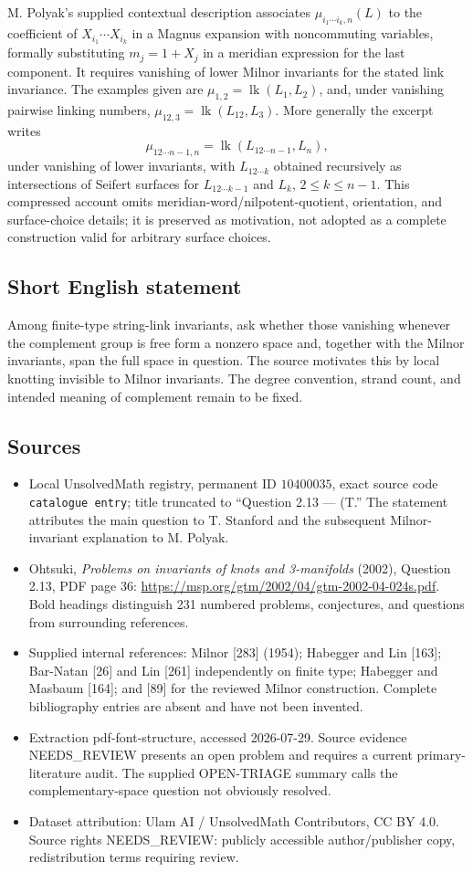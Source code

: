\documentclass[11pt]{article}
\begin{document}
M. Polyak's supplied contextual description associates \(\mu_{i_1\cdots i_k,n}(L)\) to the coefficient of \(X_{i_1}\cdots X_{i_k}\) in a Magnus expansion with noncommuting variables, formally substituting \(m_j=1+X_j\) in a meridian expression for the last component. It requires vanishing of lower Milnor invariants for the stated link invariance. The examples given are \(\mu_{1,2}=\operatorname{lk}(L_1,L_2)\), and, under vanishing pairwise linking numbers, \(\mu_{12,3}=\operatorname{lk}(L_{12},L_3)\). More generally the excerpt writes
\[
 \mu_{12\cdots n-1,n}=\operatorname{lk}(L_{12\cdots n-1},L_n),
\]
under vanishing of lower invariants, with \(L_{12\cdots k}\) obtained recursively as intersections of Seifert surfaces for \(L_{12\cdots k-1}\) and \(L_k\), \(2\le k\le n-1\). This compressed account omits meridian-word/nilpotent-quotient, orientation, and surface-choice details; it is preserved as motivation, not adopted as a complete construction valid for arbitrary surface choices.
\subsection{Short English statement}
Among finite-type string-link invariants, ask whether those vanishing whenever the complement group is free form a nonzero space and, together with the Milnor invariants, span the full space in question. The source motivates this by local knotting invisible to Milnor invariants. The degree convention, strand count, and intended meaning of complement remain to be fixed.
\subsection{Sources}
\begin{itemize}
\item Local UnsolvedMath registry, permanent ID \(10400035\), exact source code \texttt{catalogue entry}; title truncated to ``Question 2.13 --- (T.'' The statement attributes the main question to T. Stanford and the subsequent Milnor-invariant explanation to M. Polyak.
\item Ohtsuki, \emph{Problems on invariants of knots and 3-manifolds} (2002), Question 2.13, PDF page 36: \url{https://msp.org/gtm/2002/04/gtm-2002-04-024s.pdf}. Bold headings distinguish 231 numbered problems, conjectures, and questions from surrounding references.
\item Supplied internal references: Milnor [283] (1954); Habegger and Lin [163]; Bar-Natan [26] and Lin [261] independently on finite type; Habegger and Masbaum [164]; and [89] for the reviewed Milnor construction. Complete bibliography entries are absent and have not been invented.
\item Extraction pdf-font-structure, accessed 2026-07-29. Source evidence NEEDS\_REVIEW presents an open problem and requires a current primary-literature audit. The supplied OPEN-TRIAGE summary calls the complementary-space question not obviously resolved.
\item Dataset attribution: Ulam AI / UnsolvedMath Contributors, CC BY 4.0. Source rights NEEDS\_REVIEW: publicly accessible author/publisher copy, redistribution terms requiring review.
\end{itemize}
\end{document}
